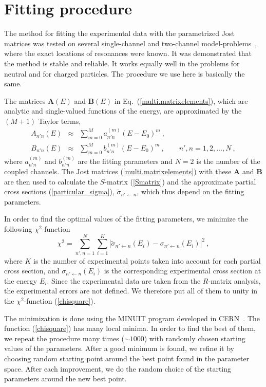 \documentclass[12pt]{article}
\begin{document}
\section{Fitting procedure}
\label{sec.procedure}
The method for fitting the experimental data with the parametrized Jost
matrices was tested on several single-channel and two-channel
model-problems~\cite{our.exp.shortrange,our.exp.Coulomb}, where the exact
locations of resonances were known. It was demonstrated that the method is
stable and reliable. It works equally well in the problems for neutral and for
charged particles. The procedure we use here is basically the same.

The matrices $\bm{A}(E)$ and $\bm{B}(E)$ in Eq.~(\ref{multi.matrixelements}),
which are analytic and single-valued functions of the energy, are approximated
by the $(M+1)$ Taylor terms,
\begin{eqnarray}
\label{Aapprox}
   A_{n'n}(E) &\approx& \sum_{m=0}^M a^{(m)}_{n'n}(E-E_0)^m\ ,\\[3mm]
\label{Bapprox}
   B_{n'n}(E) &\approx& \sum_{m=0}^M b^{(m)}_{n'n}(E-E_0)^m\ ,
   \qquad n',n=1,2,\dots,N\ ,
\end{eqnarray}
where $a^{(m)}_{n'n}$ and $b^{(m)}_{n'n}$ are the fitting parameters and $N=2$
is the number of the coupled channels. The Jost matrices
(\ref{multi.matrixelements}) with these $\bm{A}$ and $\bm{B}$ are then used to
calculate the $S$-matrix (\ref{Smatrix}) and the approximate partial cross
sections (\ref{particular_sigma}), $\tilde{\sigma}_{n'\gets n}$, which thus
depend on the fitting parameters.

In order to find the optimal values of the fitting parameters, we minimize the
following $\chi^2$-function
\begin{equation}
\label{chisquare}
   \chi^2=\sum_{n',n=1}^N\sum_{i=1}^K\left|
    \tilde{\sigma}_{n'\gets n}(E_i)-\sigma_{n'\gets n}(E_i)\right|^2\ ,
\end{equation}
where $K$ is the number of experimental points taken into
account for each partial cross section, and $\sigma_{n'\gets n}(E_i)$ is the
corresponding experimental cross section at the energy $E_i$. Since the
experimental data are taken from the $R$-matrix analysis, the experimental
errors are not defined. We therefore put all of them to unity in the
$\chi^2$-function (\ref{chisquare}).

The minimization is done using the MINUIT program developed in
CERN~\cite{MINUIT}. The function (\ref{chisquare}) has many local minima. In
order to find the best of them, we repeat the procedure many times ($\sim1000$)
with randomly chosen starting values of the parameters. After a good minimum
is found, we refine it by choosing random starting point around the best point
found in the parameter space. After each improvement, we do the random choice
of the starting parameters around the new best point.
\end{document}
